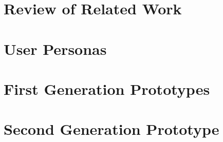 \documentclass[a4paper,10pt]{article}
\begin{document}



\newpage\null\thispagestyle{empty}\newpage
\setcounter{page}{0}
\tableofcontents
{}
\restoregeometry%
\newpage

\section{Review of Related Work}
\label{sec:review_of_related_work}







\clearpage

\section{User Personas}
\label{sec:user_personas}



	
	
	
	


\section{First Generation Prototypes}
\label{sec:first_prototypes}






\clearpage

\section{Second Generation Prototype}
\label{sec:second_generation_prototype}






\end{document}
